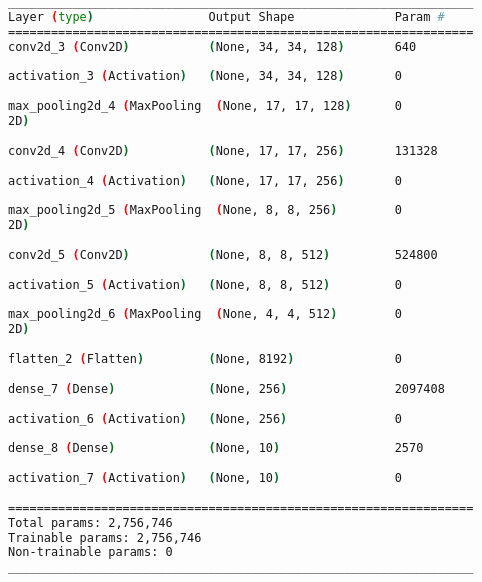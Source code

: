 \begin{lstlisting}[language=Bash,caption={Overview of layers in Custom 2D Convolutional network built into the Custom LSTM Network in \cref{lst:custom_conv_lstm_layers}.},label={lst:custom_conv_2d_layers},numbers=none,float=htb]
_________________________________________________________________
Layer (type)                Output Shape              Param #   
=================================================================
conv2d_3 (Conv2D)           (None, 34, 34, 128)       640       
                                                                
activation_3 (Activation)   (None, 34, 34, 128)       0         
                                                                
max_pooling2d_4 (MaxPooling  (None, 17, 17, 128)      0         
2D)                                                             
                                                                
conv2d_4 (Conv2D)           (None, 17, 17, 256)       131328    
                                                                
activation_4 (Activation)   (None, 17, 17, 256)       0         
                                                                
max_pooling2d_5 (MaxPooling  (None, 8, 8, 256)        0         
2D)                                                             
                                                                
conv2d_5 (Conv2D)           (None, 8, 8, 512)         524800    
                                                                
activation_5 (Activation)   (None, 8, 8, 512)         0         
                                                                
max_pooling2d_6 (MaxPooling  (None, 4, 4, 512)        0         
2D)                                                             
                                                                
flatten_2 (Flatten)         (None, 8192)              0         
                                                                
dense_7 (Dense)             (None, 256)               2097408   
                                                                
activation_6 (Activation)   (None, 256)               0         
                                                                
dense_8 (Dense)             (None, 10)                2570      
                                                                
activation_7 (Activation)   (None, 10)                0         
                                                                
=================================================================
Total params: 2,756,746
Trainable params: 2,756,746
Non-trainable params: 0
_________________________________________________________________
\end{lstlisting}